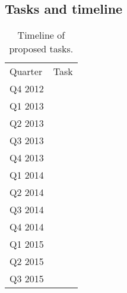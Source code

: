 \subsection{Tasks and timeline}
\begin{table}[htbp]
   \centering
   \begin{tabular}{|l|l|} 
      Quarter    & Task \\
      Q4 2012       &   \\
      Q1 2013       & \\
      Q2 2013       & \\
      Q3 2013       & \\
      Q4 2013       & \\
      Q1 2014       & \\
      Q2 2014       & \\
      Q3 2014       & \\
      Q4 2014       & \\
      Q1 2015       & \\
      Q2 2015       & \\
      Q3 2015       & \\
   \end{tabular}
   \caption{Timeline of proposed tasks.}
   \label{tab:tasks}
\end{table}
